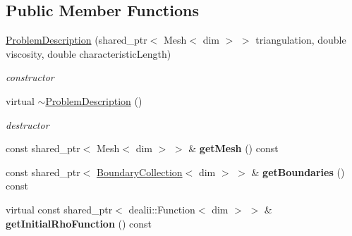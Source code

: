 \subsection*{Public Member Functions}
\begin{DoxyCompactItemize}
\item 
\hypertarget{classnatrium_1_1ProblemDescription_a98abafd1e3a7cf99c0a8125bf93b6127}{
\hyperlink{classnatrium_1_1ProblemDescription_a98abafd1e3a7cf99c0a8125bf93b6127}{ProblemDescription} (shared\_\-ptr$<$ Mesh$<$ dim $>$ $>$ triangulation, double viscosity, double characteristicLength)}
\label{classnatrium_1_1ProblemDescription_a98abafd1e3a7cf99c0a8125bf93b6127}

\begin{DoxyCompactList}\small\item\em constructor \item\end{DoxyCompactList}\item 
\hypertarget{classnatrium_1_1ProblemDescription_a5270994970ddbd9f6fc98f292c1ccc0e}{
virtual \hyperlink{classnatrium_1_1ProblemDescription_a5270994970ddbd9f6fc98f292c1ccc0e}{$\sim$ProblemDescription} ()}
\label{classnatrium_1_1ProblemDescription_a5270994970ddbd9f6fc98f292c1ccc0e}

\begin{DoxyCompactList}\small\item\em destructor \item\end{DoxyCompactList}\item 
\hypertarget{classnatrium_1_1ProblemDescription_a8913fc4d53b76a5eb4f917a4c444c693}{
const shared\_\-ptr$<$ Mesh$<$ dim $>$ $>$ \& {\bfseries getMesh} () const }
\label{classnatrium_1_1ProblemDescription_a8913fc4d53b76a5eb4f917a4c444c693}

\item 
\hypertarget{classnatrium_1_1ProblemDescription_abb061fe78c8d289fe2a4a9000015d842}{
const shared\_\-ptr$<$ \hyperlink{classnatrium_1_1BoundaryCollection}{BoundaryCollection}$<$ dim $>$ $>$ \& {\bfseries getBoundaries} () const }
\label{classnatrium_1_1ProblemDescription_abb061fe78c8d289fe2a4a9000015d842}

\item 
\hypertarget{classnatrium_1_1ProblemDescription_a32195b7133d6c00478e2db0c4ea9cd58}{
virtual const shared\_\-ptr$<$ dealii::Function$<$ dim $>$ $>$ \& {\bfseries getInitialRhoFunction} () const }
\label{classnatrium_1_1ProblemDescription_a32195b7133d6c00478e2db0c4ea9cd58}


\end{DoxyCompactItemize}
